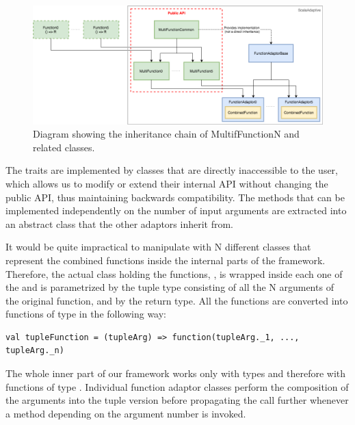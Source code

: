 \begin{figure}[h!]
	\captionsetup{justification=centering,margin=0.5cm}
	\centerline{\mbox{\includegraphics[width=140mm]{./img/inheritance_function_adaptors.png}}}
	\caption{Diagram showing the inheritance chain of MultifFunctionN and related classes.}
	\label{fig:inheritance_function_adaptors}
\end{figure}

The  traits are implemented by  classes that are directly inaccessible to the user, which allows us to modify or extend their internal API without changing the public API, thus maintaining backwards compatibility. The methods that can be implemented independently on the number of input arguments are extracted into an abstract class  that the other adaptors inherit from.

It would be quite impractical to manipulate with N different classes that represent the combined functions inside the internal parts of the framework. Therefore, the actual class holding the functions, , is wrapped inside each one of the  and is parametrized by the tuple type consisting of all the N arguments of the original function, and by the return type. All the functions are converted into functions of type  in the following way:

\lstset{style=Scala}
\begin{lstlisting}
val tupleFunction = (tupleArg) => function(tupleArg._1, ..., tupleArg._n)
\end{lstlisting}
	
The whole inner part of our framework works only with  types and therefore with functions of type . Individual function adaptor classes perform the composition of the arguments into the tuple version before propagating the call further whenever a method depending on the argument number is invoked.

